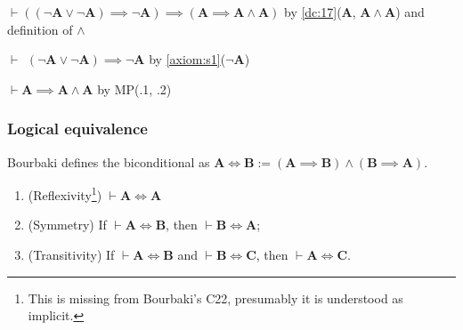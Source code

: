 \documentclass{amsart}%
\newcommand\metavariable[1]{\boldsymbol{#1}}
\begin{document}
\begin{pf}
\item $\vdash((\neg\metavariable{A}\lor\neg\metavariable{A})\implies\neg\metavariable{A})\implies(\metavariable{A}\implies\metavariable{A}\land\metavariable{A})$
by \ref{dc:17}($\metavariable{A}$, $\metavariable{A}\land\metavariable{A}$)
and definition of $\land$
\item $\vdash\phantom{(}(\neg\metavariable{A}\lor\neg\metavariable{A})\implies\neg\metavariable{A}$
  by \ref{axiom:s1}($\neg\metavariable{A}$)
\item $\vdash\metavariable{A}\implies\metavariable{A}\land\metavariable{A}$
  by MP(.1, .2)
\end{pf}

\subsubsection{Logical equivalence}

\begin{definition}
Bourbaki defines the biconditional as
$\metavariable{A}\iff\metavariable{B}:=(\metavariable{A}\implies\metavariable{B})\land(\metavariable{B}\implies\metavariable{A})$.
\end{definition}


\begin{dc}\label{dc:22}
\begin{enumerate}[start=0]
\item (Reflexivity\footnote{This is missing from Bourbaki's C22,
presumably it is understood as implicit.}) $\vdash\metavariable{A}\iff\metavariable{A}$
\item (Symmetry) If $\vdash\metavariable{A}\iff\metavariable{B}$, then $\vdash\metavariable{B}\iff\metavariable{A}$;
\item (Transitivity) If $\vdash\metavariable{A}\iff\metavariable{B}$ and $\vdash\metavariable{B}\iff\metavariable{C}$,
  then $\vdash\metavariable{A}\iff\metavariable{C}$.
\end{enumerate}
\end{dc}
\end{document}
